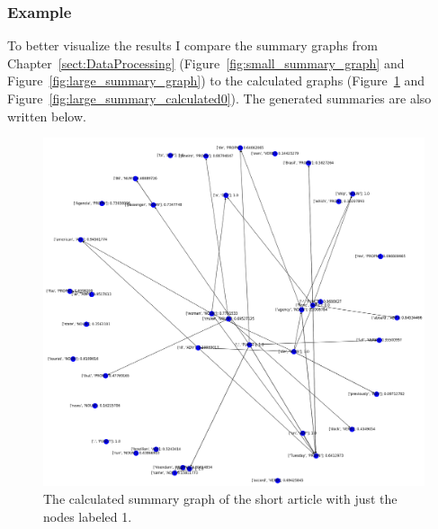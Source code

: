 \subsubsection{Example}
To better visualize the results I compare the summary graphs from Chapter~\ref{sect:DataProcessing} (Figure~\ref{fig:small_summary_graph} and Figure~\ref{fig:large_summary_graph}) to the calculated graphs (Figure~\ref{fig:small_summary_calculated0} and Figure~\ref{fig:large_summary_calculated0}). The generated summaries are also written below.

\begin{figure}[!ht]
	\centering
	\includegraphics[width=150mm, keepaspectratio]{figures/small_predicted.png}
	\caption{The calculated summary graph of the short article with just the nodes labeled 1.}
	\label{fig:small_summary_calculated0}
\end{figure}

